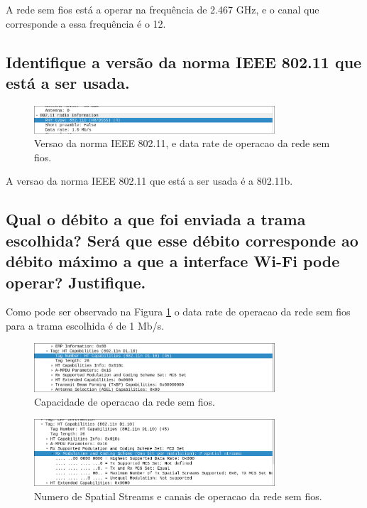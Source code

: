 \documentclass{article}
\begin{document}
A rede sem fios está a operar na frequência de 2.467 GHz, e o canal que corresponde a essa frequência é o 12.

\subsection{Identifique a versão da norma IEEE 802.11 que está a ser usada.}

\begin{figure}[h]
    \centering
    \includegraphics[width=0.8\textwidth]{images/ver.png}
    \caption{\label{fig:ver}Versao da norma IEEE 802.11, e data rate de operacao da rede sem fios.}
\end{figure}

A versao da norma IEEE 802.11 que está a ser usada é a 802.11b.

\subsection{Qual o débito a que foi enviada a trama escolhida? Será que esse débito  corresponde ao débito máximo a que a interface Wi-Fi pode operar? Justifique.}

Como pode ser observado na Figura \ref{fig:ver} o data rate de operacao da rede sem fios para a trama escolhida é de 1 Mb/s.

\begin{figure}[h]
    \centering
    \includegraphics[width=0.8\textwidth]{images/ht.png}
    \caption{\label{fig:ht}Capacidade de operacao da rede sem fios.}
\end{figure}

\begin{figure}[h]
    \centering
    \includegraphics[width=0.8\textwidth]{images/channels.png}
    \caption{\label{fig:channels}Numero de Spatial Streams e canais de operacao da rede sem fios.}
\end{figure}
\end{document}
